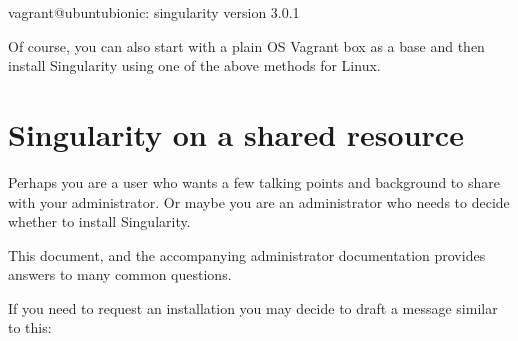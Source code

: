 \documentclass[letterpaper,10pt,english]{sphinxmanual}
\begin{document}
%
\begin{sphinxVerbatim}[commandchars=\\\{\}]
vagrant@ubuntu\PYGZhy{}bionic:\PYGZti{}\PYGZdl{} singularity version
    3.0.1
\end{sphinxVerbatim}

Of course, you can also start with a plain OS Vagrant box as a base and then
install Singularity using one of the above methods for Linux.


\section{Singularity on a shared resource}
\label{\detokenize{installation:singularity-on-a-shared-resource}}
Perhaps you are a user who wants a few talking points and background to share
with your administrator.  Or maybe you are an administrator who needs to decide
whether to install Singularity.

This document, and the accompanying administrator documentation provides answers
to many common questions.

If you need to request an installation you may decide to draft a message similar
to this:
\end{document}
